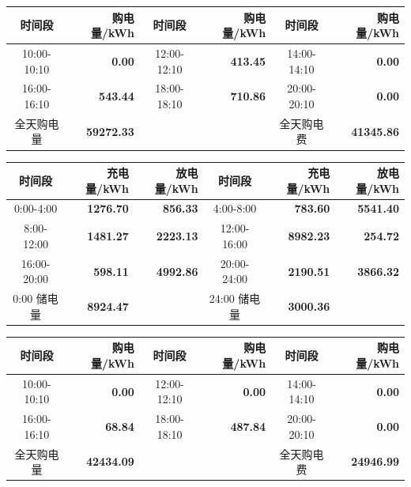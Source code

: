 {\setlength{\tabcolsep}{2pt}
\begin{center}
\begin{tabular}{|c|r|c|r|c|r|}
\hline
时间段 & 购电量/kWh & 时间段 & 购电量/kWh & 时间段 & 购电量/kWh \\
\hline
10:00-10:10 & \textbf{0.00} & 12:00-12:10 & \textbf{413.45} & 14:00-14:10 & \textbf{0.00} \\
\hline
16:00-16:10 & \textbf{543.44} & 18:00-18:10 & \textbf{710.86} & 20:00-20:10 & \textbf{0.00} \\
\hline
全天购电量 & \textbf{59272.33} & & & 全天购电费 & \textbf{41345.86} \\
\hline
\end{tabular}
\par{}

\vspace{0.15\baselineskip}
\begin{tabular}{|c|r|r|c|r|r|}
\hline
时间段 & 充电量/kWh & 放电量/kWh & 时间段 & 充电量/kWh & 放电量/kWh \\
\hline
0:00-4:00 & \textbf{1276.70} & \textbf{856.33} & 4:00-8:00 & \textbf{783.60} & \textbf{5541.40} \\
\hline
8:00-12:00 & \textbf{1481.27} & \textbf{2223.13} & 12:00-16:00 & \textbf{8982.23} & \textbf{254.72} \\
\hline
16:00-20:00 & \textbf{598.11} & \textbf{4992.86} & 20:00-24:00 & \textbf{2190.51} & \textbf{3866.32} \\
\hline
0:00 储电量 & \textbf{8924.47} & & 24:00 储电量 & \textbf{3000.36} & \\
\hline
\end{tabular}
\par{}

\vspace{0.15\baselineskip}
\begin{tabular}{|c|r|c|r|c|r|}
\hline
时间段 & 购电量/kWh & 时间段 & 购电量/kWh & 时间段 & 购电量/kWh \\
\hline
10:00-10:10 & \textbf{0.00} & 12:00-12:10 & \textbf{0.00} & 14:00-14:10 & \textbf{0.00} \\
\hline
16:00-16:10 & \textbf{68.84} & 18:00-18:10 & \textbf{487.84} & 20:00-20:10 & \textbf{0.00} \\
\hline
全天购电量 & \textbf{42434.09} & & & 全天购电费 & \textbf{24946.99} \\
\hline
\end{tabular}
\par{}


\end{center}}
